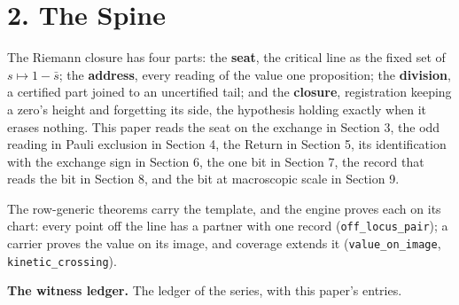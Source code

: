 \documentclass[10pt]{article}
\begin{document}
\hypertarget{the-spine}{%
\section{2. The Spine}\label{the-spine}}

The Riemann closure has four parts: the \textbf{seat}, the critical line
as the fixed set of \(s\mapsto1-\bar s\); the \textbf{address}, every
reading of the value one proposition; the \textbf{division}, a certified
part joined to an uncertified tail; and the \textbf{closure},
registration keeping a zero's height and forgetting its side, the
hypothesis holding exactly when it erases nothing. This paper reads the
seat on the exchange in Section 3, the odd reading in Pauli exclusion in
Section 4, the Return in Section 5, its identification with the exchange
sign in Section 6, the one bit in Section 7, the record that reads the
bit in Section 8, and the bit at macroscopic scale in Section 9.

The row-generic theorems carry the template, and the engine proves each
on its chart: every point off the line has a partner with one record
(\texttt{off\_locus\_pair}); a carrier proves the value on its image,
and coverage extends it (\texttt{value\_on\_image},
\texttt{kinetic\_crossing}).

\textbf{The witness ledger.} The ledger of the series, with this paper's
entries.

\begingroup\scriptsize
\end{document}
